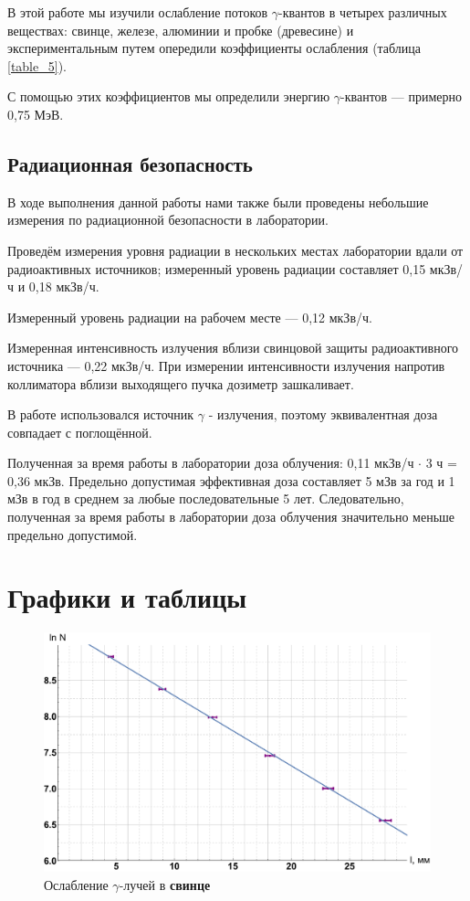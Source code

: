 \documentclass[12pt]{kiarticle}
\newcommand{\ga}{\ensuremath{\gamma}}
\begin{document}
В этой работе мы изучили ослабление потоков \ga-квантов в четырех различных веществах: свинце, железе, алюминии и пробке (древесине) и экспериментальным путем опередили коэффициенты ослабления (таблица \ref{table_5}). 

С помощью этих коэффициентов мы определили энергию \ga-квантов --- примерно 0,75 МэВ.

\subsection*{Радиационная безопасность}

В ходе выполнения данной работы нами также были проведены небольшие измерения по радиационной безопасности в лаборатории.

Проведём измерения уровня радиации в нескольких местах лаборатории вдали от радиоактивных источников; измеренный уровень радиации составляет 0,15 мкЗв/ч и 0,18 мкЗв/ч.

Измеренный уровень радиации на рабочем месте — 0,12 мкЗв/ч.

Измеренная интенсивность излучения вблизи свинцовой защиты радиоактивного источника — 0,22 мкЗв/ч. При измерении интенсивности излучения напротив коллиматора вблизи выходящего пучка дозиметр зашкаливает.

В работе использовался источник $\gamma$ - излучения, поэтому эквивалентная доза совпадает с поглощённой. 

Полученная за время работы в лаборатории доза облучения: 0,11 мкЗв/ч $\cdot$ 3 ч = 0,36 мкЗв. Предельно допустимая эффективная доза составляет 5 мЗв за год и 1 мЗв в год в среднем за любые последовательные 5 лет. Следовательно, полученная за время работы в лаборатории доза облучения значительно меньше предельно допустимой.

\section*{Графики и таблицы}

\begin{figure}[h!]
	\label{graf_pb}
	\includegraphics[scale=0.47]{pb.pdf}
	\caption{Ослабление \ga-лучей в \textbf{свинце}}
\end{figure}
\end{document}
